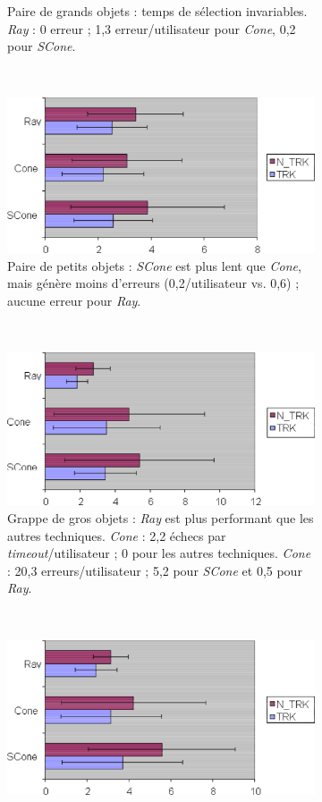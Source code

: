 \begin{figure}[!htbp]
\begin{subfigure}[t]{0.49\textwidth}
			\caption{Paire de grands objets : temps de sélection invariables. \emph{Ray} : 0 erreur ; 1,3 erreur/utilisateur pour \emph{Cone}, 0,2 pour \emph{SCone}.}
			\label{fig:shadowPLarge}
		\end{subfigure}
		~
		\begin{subfigure}[t]{0.49\textwidth}
			\centering
			\includegraphics[width=\textwidth]{figures/ch2/shadowPSmall}
			\caption{Paire de petits objets : \emph{SCone} est plus lent que \emph{Cone}, mais génère moins d'erreurs (0,2/utilisateur vs. 0,6) ; aucune erreur pour \emph{Ray}.}
			\label{fig:shadowPSmall}
		\end{subfigure}
		~
		\begin{subfigure}[t]{0.49\textwidth}
			\centering
			\includegraphics[width=\textwidth]{figures/ch2/shadowCLarge}
			\caption{Grappe de gros objets : \emph{Ray} est plus performant que les autres techniques. \emph{Cone} : 2,2 échecs par \emph{timeout}/utilisateur ; 0 pour les autres techniques. \emph{Cone} : 20,3 erreurs/utilisateur ; 5,2 pour \emph{SCone} et 0,5 pour \emph{Ray}.}
			\label{fig:shadowCLarge}
		\end{subfigure}
		~
		\begin{subfigure}[t]{0.49\textwidth}
			\centering
			\includegraphics[width=\textwidth]{figures/ch2/shadowCSmall}

\end{subfigure}
\end{figure}
